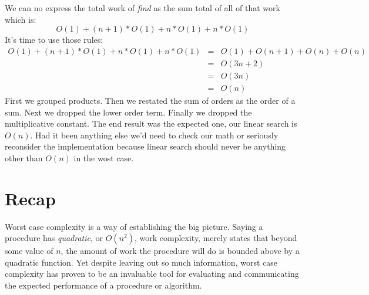 \documentclass[]{tufte-handout}
\begin{document}
We can no express the total work of \textit{find} as the sum total of all of that work which is:
\[
O(1) + (n+1)*O(1) + n*O(1) + n*O(1)
\]
It's time to use those rules:
\begin{equation*}
\begin{array}{rcl}
O(1) + (n+1)*O(1) + n*O(1) + n*O(1) &=& O(1) + O( n+1) + O(n) + O(n) \\
 &=&  O(3n+2) \\
 &=&  O(3n) \\
 &=&  O(n)
\end{array}
\end{equation*}
First we grouped products. Then we restated the sum of orders as the order of a sum. Next we dropped the lower order term. Finally we dropped the multiplicative constant. The end result was the expected one, our linear search is $O(n)$. Had it been anything else we'd need to check our math or seriously reconsider the implementation because linear search should never be anything other than $O(n)$ in the wost case.

\section{Recap}

Worst case complexity is a way of establishing the big picture.  Saying a procedure has \textit{quadratic}, or $O(n^2)$, work complexity, merely states that beyond some value of $n$, the amount of work the procedure will do is bounded above by a quadratic function.  Yet despite leaving out so much information, worst case complexity has proven to be an invaluable tool for evaluating and communicating the expected performance of a procedure or algorithm.
\end{document}
